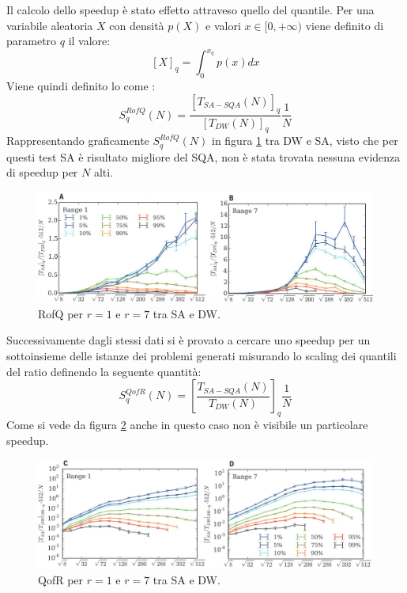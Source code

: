 Il calcolo dello speedup è stato effetto attraveso quello del quantile. Per una variabile aleatoria $X$ con densità $p(X)$ e valori $x \in [0, +\infty)$ viene definito  di parametro $q$ il valore:
$$[X]_q = \int_0^{x_q} p(x) dx$$
Viene quindi definito lo  come :
$$S_{q}^{RofQ}(N) = \frac{[T_{SA-SQA}(N)]_q}{[T_{DW}(N)]_q}\frac{1}{N}$$
Rappresentando graficamente $S_{q}^{RofQ}(N)$ in figura \ref{figura:RofQ} tra DW e SA, visto che per questi test SA è risultato migliore del SQA, non è stata trovata nessuna evidenza di speedup per $N$ alti.

\begin{figure}[htbp]
  \centering
  \includegraphics[scale=0.3]{Immagini/RofQ.jpg}
  \caption{RofQ per $r=1$ e $r=7$ tra SA e DW.}
  \label{figura:RofQ}
\end{figure}

Successivamente dagli stessi dati si è provato a cercare uno speedup per un sottoinsieme delle istanze dei problemi generati misurando lo scaling dei quantili del ratio definendo la seguente quantità:
$$S_{q}^{QofR}(N) = \left[\frac{T_{SA-SQA}(N)}{T_{DW}(N)}\right]_q \frac{1}{N}$$
Come si vede da figura \ref{figura:QofR} anche in questo caso non è visibile un particolare speedup.
\begin{figure}[htbp]
  \centering
  \includegraphics[scale=0.3]{Immagini/QofR.jpg}
  \caption{QofR per $r=1$ e $r=7$ tra SA e DW.}
  \label{figura:QofR}
\end{figure}


